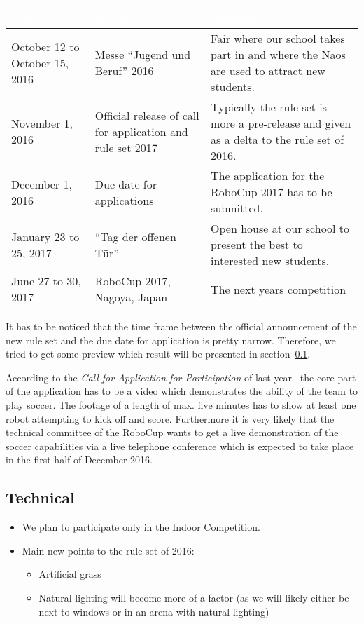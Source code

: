\documentclass[12pt]{article}
\theoremstyle{definition}
\begin{document}
\begin{tabular}{p{.21\linewidth}p{.3\linewidth}p{.42\linewidth}}
\cellcolor[gray]{0.5}\textcolor{white}{Date} & \cellcolor[gray]{0.43}\textcolor{white}{Event} & \cellcolor[gray]{0.5}\textcolor{white}{Remarks} \\ \hline
October 12 to October 15, 2016 & Messe ``Jugend und Beruf'' 2016 & Fair where our school takes part in and where the Naos are used to attract new students. \\
November 1, 2016 & Official release of call for application and rule set 2017 & Typically the rule set is more a pre-release and given as a delta to the rule set of 2016. \\
December 1, 2016 & Due date for applications & The application for the RoboCup 2017 has to be submitted.\\
January 23 to 25, 2017 & ``Tag der offenen Tür'' & Open house at our school to present the best to interested new students.\\
June 27 to 30, 2017 & RoboCup 2017, Nagoya, Japan & The next years competition
\end{tabular}

It has to be noticed that the time frame between the official announcement of the new rule set and the due date for application is pretty narrow. Therefore, we tried to get some preview which result will be presented in section~\ref{sec:technical}.

According to the {\em Call for Application for Participation} of last year~\cite{robocup_2016_standard_platform_league_call_2015} the core part of the application has to be a video which demonstrates the ability of the team to play soccer. The footage of a length of max. five minutes has to show at least one robot attempting to kick off and score. Furthermore it is very likely that the technical committee of the RoboCup wants to get a live demonstration of the soccer capabilities via a live telephone conference which is expected to take place in the first half of December 2016.

\subsection{Technical}\label{sec:technical}
\begin{itemize}
	\item We plan to participate only in the Indoor Competition.
	\item Main new points to the rule set of 2016:
	\begin{itemize}
		\item Artificial grass
		\item Natural lighting will become more of a factor (as we will likely either be next to windows or in an arena with natural lighting)
	\end{itemize}
\end{itemize}
\end{document}
